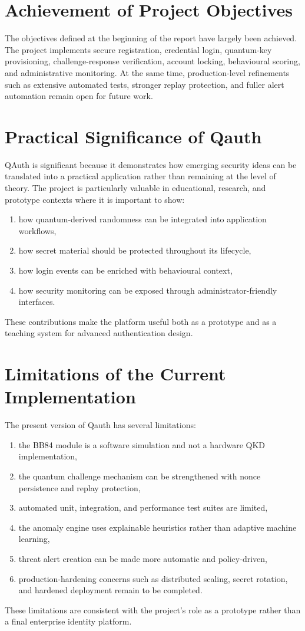 \documentclass[12pt,a4paper]{report}
\begin{document}
\section{Achievement of Project Objectives}
The objectives defined at the beginning of the report have largely been achieved. The project implements secure registration, credential login, quantum-key provisioning, challenge-response verification, account locking, behavioural scoring, and administrative monitoring. At the same time, production-level refinements such as extensive automated tests, stronger replay protection, and fuller alert automation remain open for future work.

\section{Practical Significance of Qauth}
QAuth is significant because it demonstrates how emerging security ideas can be translated into a practical application rather than remaining at the level of theory. The project is particularly valuable in educational, research, and prototype contexts where it is important to show:

\begin{enumerate}
    \item how quantum-derived randomness can be integrated into application workflows,
    \item how secret material should be protected throughout its lifecycle,
    \item how login events can be enriched with behavioural context,
    \item how security monitoring can be exposed through administrator-friendly interfaces.
\end{enumerate}
These contributions make the platform useful both as a prototype and as a teaching system for advanced authentication design.

\section{Limitations of the Current Implementation}
The present version of Qauth has several limitations:

\begin{enumerate}
    \item the BB84 module is a software simulation and not a hardware QKD implementation,
    \item the quantum challenge mechanism can be strengthened with nonce persistence and replay protection,
    \item automated unit, integration, and performance test suites are limited,
    \item the anomaly engine uses explainable heuristics rather than adaptive machine learning,
    \item threat alert creation can be made more automatic and policy-driven,
    \item production-hardening concerns such as distributed scaling, secret rotation, and hardened deployment remain to be completed.
\end{enumerate}
These limitations are consistent with the project's role as a prototype rather than a final enterprise identity platform.
\end{document}
